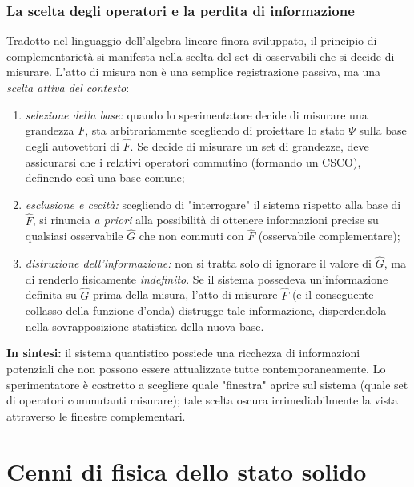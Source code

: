 \documentclass[a4paper,11pt]{report}
\begin{document}
\subsection{La scelta degli operatori e la perdita di informazione}
Tradotto nel linguaggio dell'algebra lineare finora sviluppato, il principio di complementarietà si manifesta nella scelta del set di osservabili che si decide di misurare.
L'atto di misura non è una semplice registrazione passiva, ma una \textit{scelta attiva del contesto}:
\begin{enumerate}
    \item \textit{selezione della base:}
    quando lo sperimentatore decide di misurare una grandezza $F$, sta arbitrariamente scegliendo di proiettare lo stato $\Psi$ sulla base degli autovettori di $\hat{F}$. Se decide di misurare un set di grandezze, deve assicurarsi che i relativi operatori commutino (formando un CSCO), definendo così una base comune;
    
    \item \textit{esclusione e cecità:}
    scegliendo di "interrogare" il sistema rispetto alla base di $\hat{F}$, si rinuncia \textit{a priori} alla possibilità di ottenere informazioni precise su qualsiasi osservabile $\hat{G}$ che non commuti con $\hat{F}$ (osservabile complementare);
    
    \item \textit{distruzione dell'informazione:}
    non si tratta solo di ignorare il valore di $\hat{G}$, ma di renderlo fisicamente \textit{indefinito}. Se il sistema possedeva un'informazione definita su $\hat{G}$ prima della misura, l'atto di misurare $\hat{F}$ (e il conseguente collasso della funzione d'onda) distrugge tale informazione, disperdendola nella sovrapposizione statistica della nuova base.
\end{enumerate}
\textbf{In sintesi:} il sistema quantistico possiede una ricchezza di informazioni potenziali che non possono essere attualizzate tutte contemporaneamente. Lo sperimentatore è costretto a scegliere quale "finestra" aprire sul sistema (quale set di operatori commutanti misurare); tale scelta oscura irrimediabilmente la vista attraverso le finestre complementari.





\chapter{Cenni di fisica dello stato solido}
\end{document}

